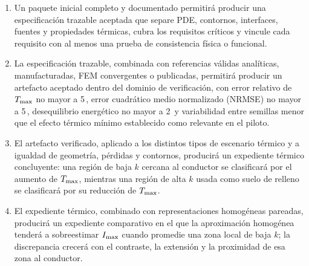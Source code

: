 \begin{enumerate}[label=HE\arabic*.]
  \item Un paquete inicial completo y documentado permitirá producir una especificación trazable aceptada que separe PDE, contornos, interfaces, fuentes y propiedades térmicas, cubra los requisitos críticos y vincule cada requisito con al menos una prueba de consistencia física o funcional.
  \item La especificación trazable, combinada con referencias válidas analíticas, manufacturadas, FEM convergentes o publicadas, permitirá producir un artefacto aceptado dentro del dominio de verificación, con error relativo de $T_{\max}$ no mayor a 5\,\pct{}, error cuadrático medio normalizado (NRMSE) no mayor a 5\,\pct{}, desequilibrio energético no mayor a 2\,\pct{} y variabilidad entre semillas menor que el efecto térmico mínimo establecido como relevante en el piloto.
  \item El artefacto verificado, aplicado a los distintos tipos de escenario térmico y a igualdad de geometría, pérdidas y contornos, producirá un expediente térmico concluyente: una región de baja $k$ cercana al conductor se clasificará por el aumento de $T_{\max}$, mientras una región de alta $k$ usada como suelo de relleno se clasificará por su reducción de $T_{\max}$.
  \item El expediente térmico, combinado con representaciones homogéneas pareadas, producirá un expediente comparativo en el que la aproximación homogénea tenderá a sobreestimar $I_{\max}$ cuando promedie una zona local de baja $k$; la discrepancia crecerá con el contraste, la extensión y la proximidad de esa zona al conductor.
\end{enumerate}

